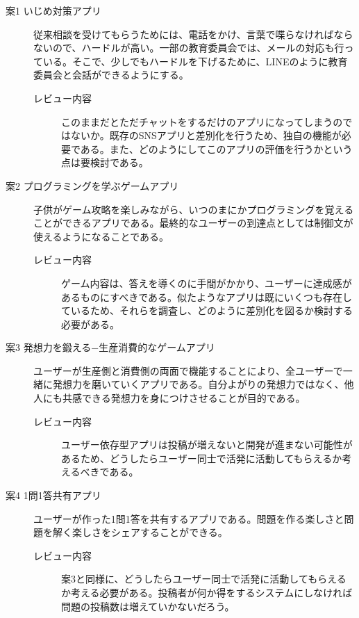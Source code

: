 \documentclass[openany,11pt,papersize]{jsbook}
\begin{document}
\begin{description}
 \item[案1 いじめ対策アプリ]
従来相談を受けてもらうためには、電話をかけ、言葉で喋らなければならないので、ハードルが高い。一部の教育委員会では、メールの対応も行っている。そこで、少しでもハードルを下げるために、LINEのように教育委員会と会話ができるようにする。
\begin{description}
 	\item[レビュー内容]

	このままだとただチャットをするだけのアプリになってしまうのではないか。既存のSNSアプリと差別化を行うため、独自の機能が必要である。また、どのようにしてこのアプリの評価を行うかという点は要検討である。
	 \end{description}
 
  \item[案2 プログラミングを学ぶゲームアプリ]
子供がゲーム攻略を楽しみながら、いつのまにかプログラミングを覚えることができるアプリである。最終的なユーザーの到達点としては制御文が使えるようになることである。
	\begin{description}
 	\item[レビュー内容]
	ゲーム内容は、答えを導くのに手間がかかり、ユーザーに達成感があるものにすべきである。似たようなアプリは既にいくつも存在しているため、それらを調査し、どのように差別化を図るか検討する必要がある。
	 \end{description}

  \item[案3 発想力を鍛える−生産消費的なゲームアプリ]
  ユーザーが生産側と消費側の両面で機能することにより、全ユーザーで一緒に発想力を磨いていくアプリである。自分よがりの発想力ではなく、他人にも共感できる発想力を身につけさせることが目的である。
	\begin{description}
 	\item[レビュー内容]
	ユーザー依存型アプリは投稿が増えないと開発が進まない可能性があるため、どうしたらユーザー同士で活発に活動してもらえるか考えるべきである。
	 \end{description}
	 
 \item[案4 1問1答共有アプリ]
  ユーザーが作った1問1答を共有するアプリである。問題を作る楽しさと問題を解く楽しさをシェアすることができる。
	\begin{description}
 	\item[レビュー内容]
	案3と同様に、どうしたらユーザー同士で活発に活動してもらえるか考える必要がある。投稿者が何か得をするシステムにしなければ問題の投稿数は増えていかないだろう。
	 \end{description}
	 

\end{description}
\end{document}
